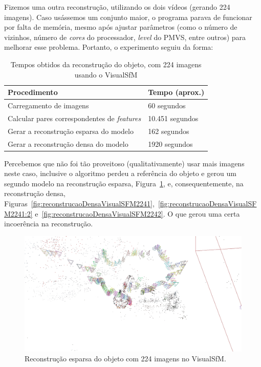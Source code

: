 Fizemos uma outra reconstrução, utilizando os dois vídeos (gerando 224 imagens). Caso usássemos um conjunto maior, o programa parava de funcionar por falta de memória, mesmo após ajustar parâmetros (como o número de vizinhos, número de \emph{cores} do processador, \emph{level} do PMVS, entre outros) para melhorar esse problema. Portanto, o experimento seguiu da forma:

\begin{table}[h!]
\caption{Tempos obtidos da reconstrução do objeto, com 224 imagens usando o VisualSfM}
\label{tab:temposSfM224}
\begin{tabular}{|l|p{4.7cm}|}
\hline
Procedimento & Tempo (aprox.) \\ \hline
Carregamento de imagens & 60 segundos \\ \hline
Calcular pares correspondentes de \emph{features} & 10.451 segundos \\ \hline
Gerar a reconstrução esparsa do modelo & 162 segundos \\ \hline
Gerar a reconstrução densa do modelo & 1920 segundos \\ \hline
\end{tabular}
\end{table}

Percebemos que não foi tão proveitoso (qualitativamente) usar mais imagens neste
caso, inclusive o algoritmo perdeu a referência do objeto e gerou um segundo
modelo na reconstrução esparsa,
Figura~\ref{fig:reconstrucaoEsparsaVisualSFM224}, e, consequentemente, na
reconstrução densa,
Figuras~\ref{fig:reconstrucaoDensaVisualSFM2241},~\ref{fig:reconstrucaoDensaVisualSFM2241:2} e~\ref{fig:reconstrucaoDensaVisualSFM2242}. O que gerou uma certa incoerência na reconstrução.

\begin{figure}[!h]
	\centering
	\includegraphics[width=0.5\linewidth]{figs/perto_longe_esparsa.jpg}
	\caption{%
	Reconstrução esparsa do objeto com 224 imagens no VisualSfM.
	}\label{fig:reconstrucaoEsparsaVisualSFM224}
\end{figure}

